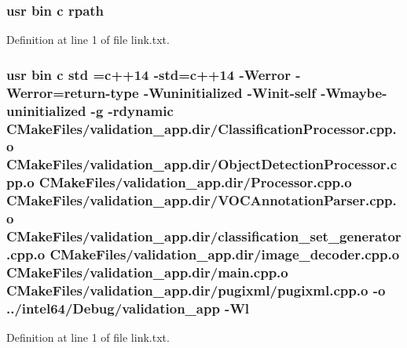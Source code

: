 \subsubsection[{\texorpdfstring{rpath}{rpath}}]{\setlength{\rightskip}{0pt plus 5cm}usr bin {\bf c} rpath}\hypertarget{validation__app_2CMakeFiles_2validation__app_8dir_2link_8txt_ab9d7fd7120fafa2118a4e08c1df697c7}{}\label{validation__app_2CMakeFiles_2validation__app_8dir_2link_8txt_ab9d7fd7120fafa2118a4e08c1df697c7}


Definition at line 1 of file link.\+txt.

\subsubsection[{\texorpdfstring{std}{std}}]{\setlength{\rightskip}{0pt plus 5cm}usr bin {\bf c} std ={\bf c}++14 -\/std={\bf c}++14 -\/Werror -\/Werror=return-\/type -\/Wuninitialized -\/Winit-\/self -\/Wmaybe-\/uninitialized -\/g -\/rdynamic C\+Make\+Files/validation\+\_\+app.\+dir/Classification\+Processor.\+cpp.\+o C\+Make\+Files/validation\+\_\+app.\+dir/Object\+Detection\+Processor.\+cpp.\+o C\+Make\+Files/validation\+\_\+app.\+dir/Processor.\+cpp.\+o C\+Make\+Files/validation\+\_\+app.\+dir/V\+O\+C\+Annotation\+Parser.\+cpp.\+o C\+Make\+Files/validation\+\_\+app.\+dir/classification\+\_\+set\+\_\+generator.\+cpp.\+o C\+Make\+Files/validation\+\_\+app.\+dir/image\+\_\+decoder.\+cpp.\+o C\+Make\+Files/validation\+\_\+app.\+dir/main.\+cpp.\+o C\+Make\+Files/validation\+\_\+app.\+dir/pugixml/pugixml.\+cpp.\+o -\/o ../intel64/Debug/validation\+\_\+app -\/{\bf Wl}}\hypertarget{validation__app_2CMakeFiles_2validation__app_8dir_2link_8txt_a1ccfea5f558575a112db71eeb271fabf}{}\label{validation__app_2CMakeFiles_2validation__app_8dir_2link_8txt_a1ccfea5f558575a112db71eeb271fabf}


Definition at line 1 of file link.\+txt.

